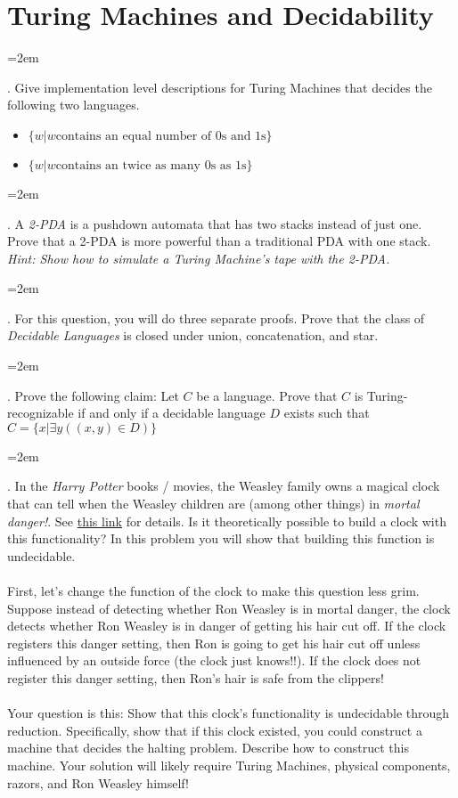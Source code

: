 \documentclass[12pt]{article}
\def\homework{Turing Machines and Decidability}
\newcounter{quesnum}
\newcommand{\question}[2][??]{
\begin{list}{\labelitemi}{\leftmargin=2em}
\item [\arabic{quesnum}.] {} {#2}
\end{list}
\addtocounter{quesnum}{1}
}
\begin{document}
\section*{\homework}


\question[3]{
Give implementation level descriptions for Turing Machines that decides the following two languages.
}

\begin{itemize}
	\item $\{w | w \text{contains an equal number of 0s and 1s} \}$
	\item $\{w | w \text{contains an twice as many 0s as 1s} \}$
\end{itemize}


\vspace{12pt}

\question[3]{
A \emph{2-PDA} is a pushdown automata that has two stacks instead of just one. Prove that a 2-PDA is more powerful than a traditional PDA with one stack. \emph{Hint: Show how to simulate a Turing Machine's tape with the 2-PDA.}
}


\vspace{12pt}

\question[3]{
For this question, you will do three separate proofs. Prove that the class of \emph{Decidable Languages} is closed under union, concatenation, and star.
}

\vspace{12pt}

\question[3]{
Prove the following claim: Let $C$ be a language. Prove that $C$ is Turing-recognizable if and only if a decidable language $D$ exists such that $C=\{x | \exists y ((x,y) \in D)\}$
}




\vspace{12pt}

\question[3]{
In the \emph{Harry Potter} books / movies, the Weasley family owns a magical clock that can tell when the Weasley children are (among other things) in \emph{mortal danger!}. See \href{https://harrypotter.fandom.com/wiki/Weasley_Clock}{this link} for details. Is it theoretically possible to build a clock with this functionality? In this problem you will show that building this function is undecidable.\\
\\
First, let's change the function of the clock to make this question less grim. Suppose instead of detecting whether Ron Weasley is in mortal danger, the clock detects whether Ron Weasley is in danger of getting his hair cut off. If the clock registers this danger setting, then Ron is going to get his hair cut off unless influenced by an outside force (the clock just knows!!). If the clock does not register this danger setting, then Ron's hair is safe from the clippers!\\
\\
Your question is this: Show that this clock's functionality is undecidable through reduction. Specifically, show that if this clock existed, you could construct a machine that decides the halting problem. Describe how to construct this machine. Your solution will likely require Turing Machines, physical components, razors, and Ron Weasley himself!
}
\end{document}
